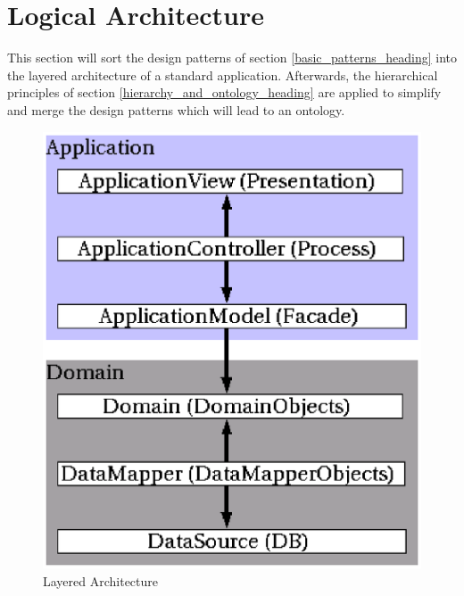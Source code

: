 %
%
%
%
%
%
%

\section{Logical Architecture}
\label{logical_architecture_heading}

This section will sort the design patterns of section \ref{basic_patterns_heading}
into the layered architecture of a standard application. Afterwards, the
hierarchical principles of section \ref{hierarchy_and_ontology_heading} are applied
to simplify and merge the design patterns which will lead to an ontology.

\begin{figure}[ht]
    \begin{center}
        \includegraphics[scale=0.3]{vector/layered_architecture.eps}
        \caption{Layered Architecture}
        \label{layered_architecture_figure}
    \end{center}
\end{figure}

